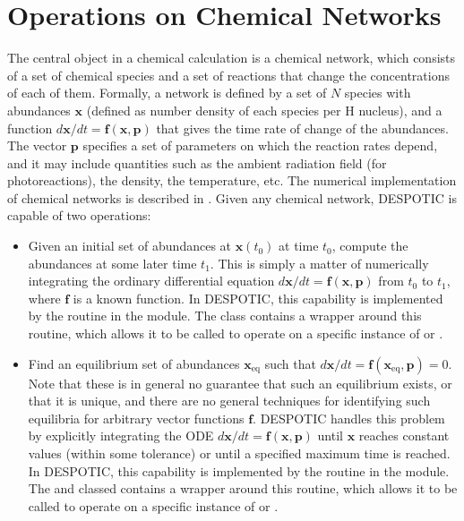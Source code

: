 \documentclass[letterpaper,10pt,english]{sphinxmanual}
\begin{document}
\section{Operations on Chemical Networks}
\label{chemistry:operations-on-chemical-networks}\label{chemistry:ssec-operations}
The central object in a chemical calculation is a chemical network,
which consists of a set of chemical species and a set of reactions
that change the concentrations of each of them. Formally, a network is
defined by a set of \(N\) species with abundances
\(\mathbf{x}\) (defined as number density of each species per H
nucleus), and a function \(d\mathbf{x}/dt = \mathbf{f}(\mathbf{x},
\mathbf{p})\) that gives the time rate of change of the abundances. The
vector \(\mathbf{p}\) specifies a set of parameters on which the
reaction rates depend, and it may include quantities such as the
ambient radiation field (for photoreactions), the density, the
temperature, etc. The numerical implementation of chemical networks is
described in {\hyperref[chemistry:ssec-chemnetworks]{\emph{}}}. Given any chemical network,
DESPOTIC is capable of two operations:
\begin{itemize}
\item {} 
Given an initial set of abundances at \(\mathbf{x}(t_0)\) at
time \(t_0\), compute the abundances at some later time
\(t_1\). This is simply a matter of numerically integrating the
ordinary differential equation \(d\mathbf{x}/dt =
\mathbf{f}(\mathbf{x},\mathbf{p})\) from \(t_0\) to \(t_1\),
where \(\mathbf{f}\) is a known function. In DESPOTIC, this
capability is implemented by the routine  in the
 module. The  class
contains a wrapper around this routine, which allows it to be
called to operate on a specific instance of  or
.

\item {} 
Find an equilibrium set of abundances
\(\mathbf{x}_{\mathrm{eq}}\) such that \(d\mathbf{x}/dt =
\mathbf{f}(\mathbf{x}_{\mathrm{eq}}, \mathbf{p}) = 0\). Note that
these is in general no guarantee that such an equilibrium exists, or
that it is unique, and there are no general techniques for
identifying such equilibria for arbitrary vector functions
\(\mathbf{f}\). DESPOTIC handles this problem by explicitly
integrating the ODE \(d\mathbf{x}/dt =
\mathbf{f}(\mathbf{x},\mathbf{p})\) until \(\mathbf{x}\) reaches
constant values (within some tolerance) or until a specified maximum
time is reached. In DESPOTIC, this capability is implemented by
the routine  in the 
module. The  and  classed contains a wrapper
around this routine, which allows it to be called to operate on a
specific instance of  or .

\end{itemize}
\end{document}
